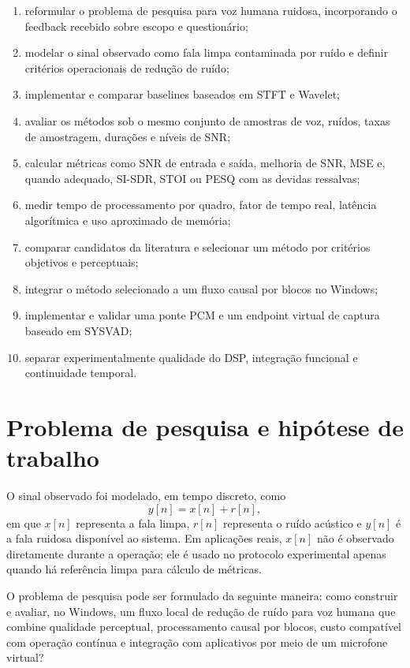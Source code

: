 \begin{enumerate}[label=\alph*)]
    \item reformular o problema de pesquisa para voz humana ruidosa, incorporando o feedback recebido sobre escopo e questionário;
    \item modelar o sinal observado como fala limpa contaminada por ruído e definir critérios operacionais de redução de ruído;
    \item implementar e comparar baselines baseados em STFT e Wavelet;
    \item avaliar os métodos sob o mesmo conjunto de amostras de voz, ruídos, taxas de amostragem, durações e níveis de SNR;
    \item calcular métricas como SNR de entrada e saída, melhoria de SNR, MSE e, quando adequado, SI-SDR, STOI ou PESQ com as devidas ressalvas;
    \item medir tempo de processamento por quadro, fator de tempo real, latência algorítmica e uso aproximado de memória;
    \item comparar candidatos da literatura e selecionar um método por critérios objetivos e perceptuais;
    \item integrar o método selecionado a um fluxo causal por blocos no Windows;
    \item implementar e validar uma ponte PCM e um endpoint virtual de captura baseado em SYSVAD;
    \item separar experimentalmente qualidade do DSP, integração funcional e continuidade temporal.
\end{enumerate}

\section{Problema de pesquisa e hipótese de trabalho}

O sinal observado foi modelado, em tempo discreto, como
\begin{equation}
    y[n] = x[n] + r[n],
    \label{eq:modelo-ruidoso}
\end{equation}
em que \(x[n]\) representa a fala limpa, \(r[n]\) representa o ruído acústico e \(y[n]\) é a fala ruidosa disponível ao sistema. Em aplicações reais, \(x[n]\) não é observado diretamente durante a operação; ele é usado no protocolo experimental apenas quando há referência limpa para cálculo de métricas.

O problema de pesquisa pode ser formulado da seguinte maneira: como construir e avaliar, no Windows, um fluxo local de redução de ruído para voz humana que combine qualidade perceptual, processamento causal por blocos, custo compatível com operação contínua e integração com aplicativos por meio de um microfone virtual?

